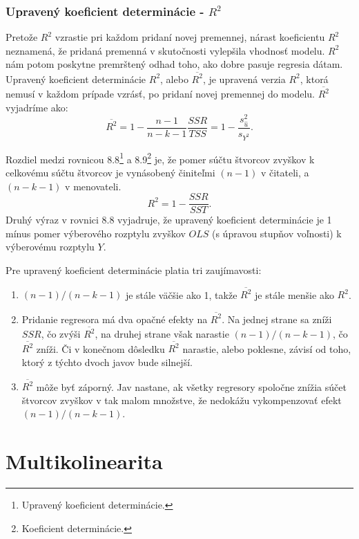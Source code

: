 \documentclass[]{tukediphc}
\begin{document}
\subsubsection{Upravený koeficient determinácie - $R^2$}

Pretože $R^2$ vzrastie pri každom pridaní novej premennej, nárast koeficientu $R^2$ neznamená, že pridaná premenná v skutočnosti vylepšila vhodnosť modelu. $R^2$ nám potom poskytne premrštený odhad toho, ako dobre pasuje regresia dátam. 
Upravený koeficient determinácie $R^2$, alebo $\overline{R^2}$, je upravená verzia $R^2$, ktorá nemusí v každom prípade vzrásť, po pridaní novej premennej do modelu. $\overline{R^2}$ vyjadríme ako:
\begin{equation}
    \overline{R^2} = 1 - \frac{n - 1}{n - k - 1} \frac{SSR}{TSS} = 1 - \frac{s_{\hat{u}}^2}{s_{Y^2}}.
\end{equation}

Rozdiel medzi rovnicou 8.8\footnote{Upravený koeficient determinácie.} a 8.9\footnote{Koeficient determinácie.} je, že pomer súčtu štvorcov zvyškov k celkovému súčtu štvorcov je vynásobený činiteľmi $(n - 1)$ v čitateli, a $(n - k - 1)$ v menovateli.
\begin{equation}
     R^2 = 1 - \frac{SSR}{SST}.
\end{equation}
Druhý výraz v rovnici 8.8 vyjadruje, že upravený koeficient determinácie je 1 mínus pomer výberového rozptylu zvyškov $OLS$ (s úpravou stupňov voľnosti) k výberovému rozptylu $Y$. 

Pre upravený koeficient determinácie platia tri zaujímavosti:
\begin{enumerate}
    \item $(n - 1) / (n - k - 1)$ je stále väčšie ako 1, takže $\overline{R^2}$ je stále menšie ako $R^2$.
    \item Pridanie regresora má dva opačné efekty na $\overline{R^2}$. Na jednej strane sa zníži $SSR$, čo zvýši $\overline{R^2}$, na druhej strane však narastie $(n - 1) / (n - k - 1)$, čo $\overline{R^2}$ zníži. Či v konečnom dôsledku $\overline{R^2}$ narastie, alebo poklesne, závisí od toho, ktorý z týchto dvoch javov bude silnejší.
    \item $\overline{R^2}$ môže byť záporný. Jav nastane, ak všetky regresory spoločne znížia súčet štvorcov zvyškov v tak malom množstve, že nedokážu vykompenzovať efekt $(n - 1) / (n - k - 1)$.    
\end{enumerate}

\newpage
\section{Multikolinearita}
\end{document}
